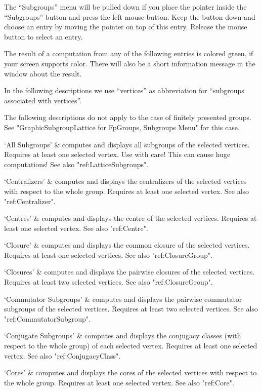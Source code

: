 The ``Subgroups'' menu will be pulled down  if you place the pointer inside
the ``Subgroups'' button and press the left mouse  button.  Keep the button
down and choose an entry   by moving the pointer  on  top of this  entry.
Release the mouse button to select an entry.

The result   of a computation from   any of the  following  entries is
colored green, if your screen supports color.  There will also be a short
information message in the {\GAP} window about the result.

In the following descriptions   we use ``vertices'' as abbreviation  for
``subgroups associated with vertices''.

The following descriptions do not apply to the case of finitely presented
groups. See "GraphicSubgroupLattice for FpGroups, Subgroups Menu" for this
case. 

\beginitems
`All Subgroups' &
computes and displays all subgroups of the selected vertices. Requires at
least one selected vertex. Use with care! This can cause huge computations!
See also "ref:LatticeSubgroups".

`Centralizers' &
computes  and displays the   centralizers of  the selected  vertices with
respect to the whole group.  Requires at  least one selected vertex.  See
also "ref:Centralizer".

`Centres' &
computes and displays  the centre of  the selected vertices.  Requires at
least one selected vertex. See also "ref:Centre".

`Closure' &
computes and    displays the common  closure  of  the  selected vertices.
Requires at least one selected vertices. See also "ref:ClosureGroup".

`Closures' &
computes  and  displays the pairwise  closures of  the selected vertices.
Requires at least two selected vertices. See also "ref:ClosureGroup".

`Commutator Subgroups' &
computes and displays  the pairwise commutator  subgroups of the selected
vertices.    Requires  at  least    two   selected  vertices. See    also
"ref:CommutatorSubgroup".

`Conjugate Subgroups' &
computes and displays the conjugacy  classes (with  respect to the  whole
group) of each  selected vertex.  Requires  at least one selected vertex.
See also "ref:ConjugacyClass".

`Cores' &
computes and displays the cores of  the selected vertices with respect to
the whole group.  Requires at least one selected vertex. See also "ref:Core".


